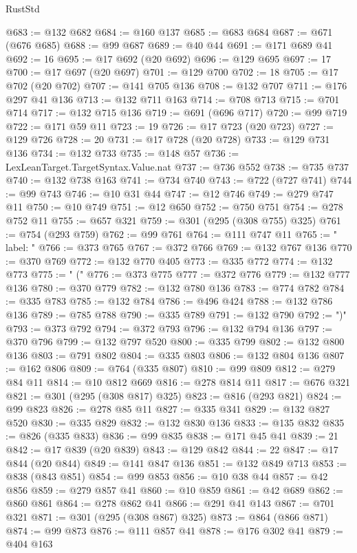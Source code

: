 \begin{lexlean}{RustStd}
\begin{coremodule}
@683 := @132 @682
@684 := @160 @137
@685 := @683 @684
@687 := @671 (@676 @685)
@688 := @99 @687
@689 := @40 @44
@691 := @171 @689 @41
@692 := 16
@695 := @17 @692 (@20 @692)
@696 := @129 @695
@697 := 17
@700 := @17 @697 (@20 @697)
@701 := @129 @700
@702 := 18
@705 := @17 @702 (@20 @702)
@707 := @141 @705 @136
@708 := @132 @707
@711 := @176 @297 @41 @136
@713 := @132 @711 @163
@714 := @708 @713
@715 := @701 @714
@717 := @132 @715 @136
@719 := @691 (@696 @717)
@720 := @99 @719
@722 := @171 @59 @11
@723 := 19
@726 := @17 @723 (@20 @723)
@727 := @129 @726
@728 := 20
@731 := @17 @728 (@20 @728)
@733 := @129 @731 @136
@734 := @132 @733
@735 := @148 @57
@736 := LexLeanTarget.TargetSyntax.Value.nat
@737 := @736 @552
@738 := @735 @737
@740 := @132 @738 @163
@741 := @734 @740
@743 := @722 (@727 @741)
@744 := @99 @743
@746 := @10 @31 @44
@747 := @12 @746
@749 := @279 @747 @11
@750 := @10 @749
@751 := @12 @650
@752 := @750 @751
@754 := @278 @752 @11
@755 := @657 @321
@759 := @301 (@295 (@308 @755) @325)
@761 := @754 (@293 @759)
@762 := @99 @761
@764 := @111 @747 @11
@765 := "  label: "
@766 := @373 @765
@767 := @372 @766
@769 := @132 @767 @136
@770 := @370 @769
@772 := @132 @770 @405
@773 := @335 @772
@774 := @132 @773
@775 := " ("
@776 := @373 @775
@777 := @372 @776
@779 := @132 @777 @136
@780 := @370 @779
@782 := @132 @780 @136
@783 := @774 @782
@784 := @335 @783
@785 := @132 @784
@786 := @496 @424
@788 := @132 @786 @136
@789 := @785 @788
@790 := @335 @789
@791 := @132 @790
@792 := ")"
@793 := @373 @792
@794 := @372 @793
@796 := @132 @794 @136
@797 := @370 @796
@799 := @132 @797 @520
@800 := @335 @799
@802 := @132 @800 @136
@803 := @791 @802
@804 := @335 @803
@806 := @132 @804 @136
@807 := @162 @806
@809 := @764 (@335 @807)
@810 := @99 @809
@812 := @279 @84 @11
@814 := @10 @812 @669
@816 := @278 @814 @11
@817 := @676 @321
@821 := @301 (@295 (@308 @817) @325)
@823 := @816 (@293 @821)
@824 := @99 @823
@826 := @278 @85 @11
@827 := @335 @341
@829 := @132 @827 @520
@830 := @335 @829
@832 := @132 @830 @136
@833 := @135 @832
@835 := @826 (@335 @833)
@836 := @99 @835
@838 := @171 @45 @41
@839 := 21
@842 := @17 @839 (@20 @839)
@843 := @129 @842
@844 := 22
@847 := @17 @844 (@20 @844)
@849 := @141 @847 @136
@851 := @132 @849 @713
@853 := @838 (@843 @851)
@854 := @99 @853
@856 := @10 @38 @44
@857 := @42 @856
@859 := @279 @857 @41
@860 := @10 @859
@861 := @42 @689
@862 := @860 @861
@864 := @278 @862 @41
@866 := @291 @41 @143
@867 := @701 @321
@871 := @301 (@295 (@308 @867) @325)
@873 := @864 (@866 @871)
@874 := @99 @873
@876 := @111 @857 @41
@878 := @176 @302 @41
@879 := @404 @163

\end{coremodule}
\end{lexlean}
